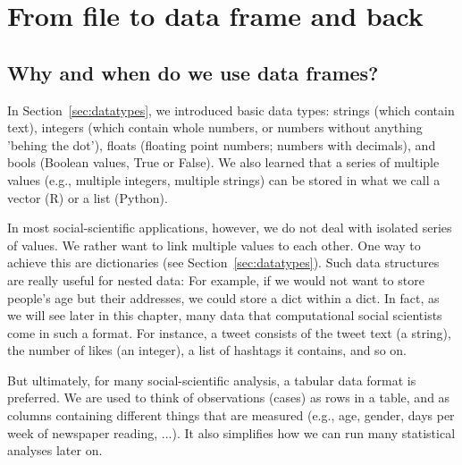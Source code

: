 \chapter{From file to data frame and back}
\label{chap:filetodata}


\section{Why and when do we use data frames?}

In Section~\ref{sec:datatypes}, we introduced basic data types: strings (which contain text), integers (which contain whole numbers, or numbers without anything 'behing the dot'), floats (floating point numbers; numbers with decimals), and bools (Boolean values, True or False). 
We also learned that a series of multiple values (e.g., multiple integers, multiple strings) can be stored in what we call a vector (R) or a list (Python).

In most social-scientific applications, however, we do not deal with isolated series of values. We rather want to link multiple values to each other. One way to achieve this are dictionaries (see Section~\ref{sec:datatypes}).
Such data structures are really useful for nested data: For example, if we would not want to store people's age but their addresses, we could store a dict within a dict.
In fact, as we will see later in this chapter, many data that computational social scientists come in such a format. For instance, a tweet consists of the tweet text (a string), the number of likes (an integer), a list of hashtags it contains, and so on.

But ultimately, for many social-scientific analysis, a tabular data format is preferred. We are used to think of observations (cases) as rows in a table, and as columns containing different things that are measured (e.g., age, gender, days per week of newspaper reading, ...). It also simplifies how we can run many statistical analyses later on.


